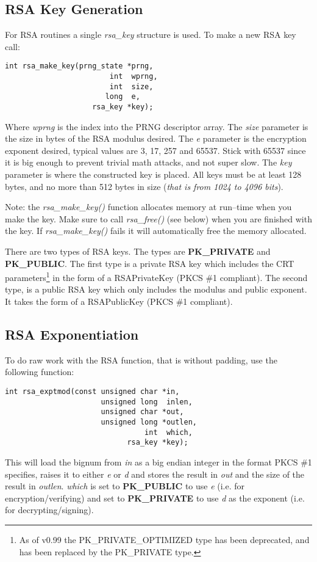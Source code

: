 \documentclass[synpaper]{book}
\begin{document}
\subsection{RSA Key Generation}

For RSA routines a single \textit{rsa\_key} structure is used.  To make a new RSA key call:
\begin{verbatim}
int rsa_make_key(prng_state *prng,
                        int  wprng,
                        int  size,
                       long  e,
                    rsa_key *key);
\end{verbatim}

Where \textit{wprng} is the index into the PRNG descriptor array.  The \textit{size} parameter is the size in bytes of the RSA modulus desired.
The \textit{e} parameter is the encryption exponent desired, typical values are 3, 17, 257 and 65537.  Stick with 65537 since it is big enough to prevent
trivial math attacks, and not super slow.  The \textit{key} parameter is where the constructed key is placed.  All keys must be at
least 128 bytes, and no more than 512 bytes in size (\textit{that is from 1024 to 4096 bits}).

Note: the \textit{rsa\_make\_key()} function allocates memory at run--time when you make the key.  Make sure to call
\textit{rsa\_free()} (see below) when you are finished with the key.  If \textit{rsa\_make\_key()} fails it will automatically
free the memory allocated.

 
There are two types of RSA keys.  The types are {\bf PK\_PRIVATE} and {\bf PK\_PUBLIC}.  The first type is a private
RSA key which includes the CRT parameters\footnote{As of v0.99 the PK\_PRIVATE\_OPTIMIZED type has been deprecated, and has been replaced by the
PK\_PRIVATE type.} in the form of a RSAPrivateKey (PKCS \#1 compliant).  The second type, is a public RSA key which only includes the modulus and public exponent.
It takes the form of a RSAPublicKey (PKCS \#1 compliant).

\subsection{RSA Exponentiation}
To do raw work with the RSA function, that is without padding, use the following function:
\begin{verbatim}
int rsa_exptmod(const unsigned char *in,
                      unsigned long  inlen,
                      unsigned char *out,
                      unsigned long *outlen,
                                int  which,
                            rsa_key *key);
\end{verbatim}
This will load the bignum from \textit{in} as a big endian integer in the format PKCS \#1 specifies, raises it to either \textit{e} or \textit{d} and stores the result
in \textit{out} and the size of the result in \textit{outlen}. \textit{which} is set to {\bf PK\_PUBLIC} to use \textit{e}
(i.e. for encryption/verifying) and set to {\bf PK\_PRIVATE} to use \textit{d} as the exponent (i.e. for decrypting/signing).
\end{document}
